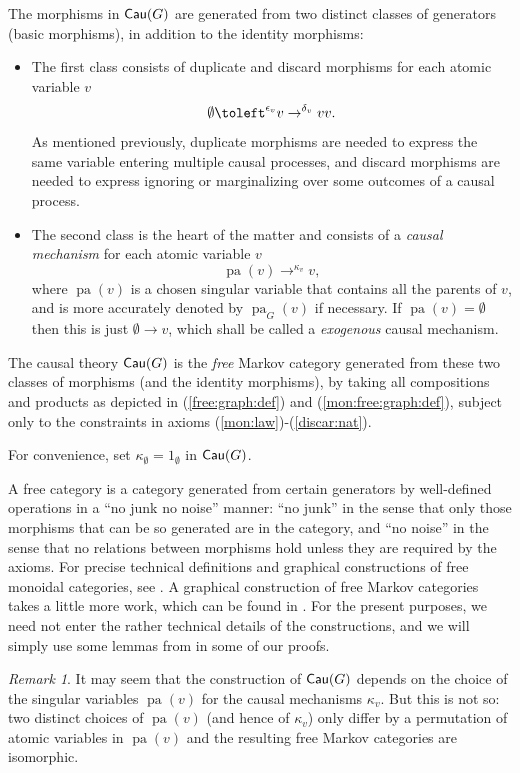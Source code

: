 \documentclass[12pt]{amsart}
\theoremstyle{plain}
\theoremstyle{definition}
\theoremstyle{remark}
\newtheorem{rem}[thm]{Remark}
\numberwithin{equation}{section}
\theoremstyle{plain}
\newcommand{\0}{\emptyset}
\newcommand{\fun}{\longrightarrow}
\newcommand{\cat}[1]{\textup{\textsf{#1}}}
\DeclareMathOperator{\cau}{\sf{Cau}}
\DeclareMathOperator{\pa}{pa}
\newcommand{\memph}[1]{{\color{magenta}\emph{#1}}}
\begin{document}
The morphisms in $\cat{Cau}(G)$ are generated from two distinct classes of generators (basic morphisms), in addition to the identity morphisms:
\begin{itemize}
  \item The first class consists of duplicate and discard morphisms for each atomic variable $v$
  \[
  \0 \toleft^{\epsilon_v} v \to^{\delta_v} vv.
   \]
   As mentioned previously, duplicate morphisms are needed to express the same variable entering multiple causal processes, and discard morphisms are needed to express ignoring or marginalizing over some outcomes of a causal process.
 \item The second class is the heart of the matter and consists of a \memph{causal mechanism} for each atomic variable $v$
      \[
      \pa(v) \to^{\kappa_v} v,
       \]
       where $\pa(v)$ is a chosen singular variable that contains all the parents of $v$,  and is more accurately denoted by $\pa_{G}(v)$ if necessary.  If $\pa(v) = \0$ then this is just $\0 \fun v$, which shall be called a \memph{exogenous} causal mechanism.
\end{itemize}

The causal theory $\cat{Cau}(G)$ is the \memph{free} Markov category generated from these two classes of morphisms (and the identity morphisms), by taking all compositions and products as depicted in (\ref{free:graph:def}) and (\ref{mon:free:graph:def}), subject only to the constraints in axioms (\ref{mon:law})-(\ref{discar:nat}).


For convenience, set $\kappa_\0 = 1_\0$ in $\cau(G)$.

A free category is a category generated from certain generators by well-defined operations in a ``no junk no noise'' manner: ``no junk'' in the sense that only those morphisms that can be so generated are in the category,  and ``no noise'' in the sense that no relations between morphisms hold unless they are required by the axioms.  For precise technical definitions and graphical constructions of free monoidal categories, see \cite{selinger2010survey}.  A graphical construction of free Markov categories takes a little more work,  which can be found in \cite{YinZhangModularity}.  For the present purposes,  we need not enter the rather technical details of the constructions, and we will simply use some lemmas from \cite{YinZhangModularity} in some of our proofs.

\begin{rem}\label{cau:mech:ind}
It may seem that the construction of $\cat{Cau}(G)$ depends on the choice of the singular variables $\pa(v)$ for the causal mechanisms $\kappa_v$. But this is not so: two distinct choices of $\pa(v)$ (and hence of $\kappa_v$) only differ by a permutation of atomic variables in $\pa(v)$ and the resulting  free  Markov categories are isomorphic.
\end{rem}
\end{document}
